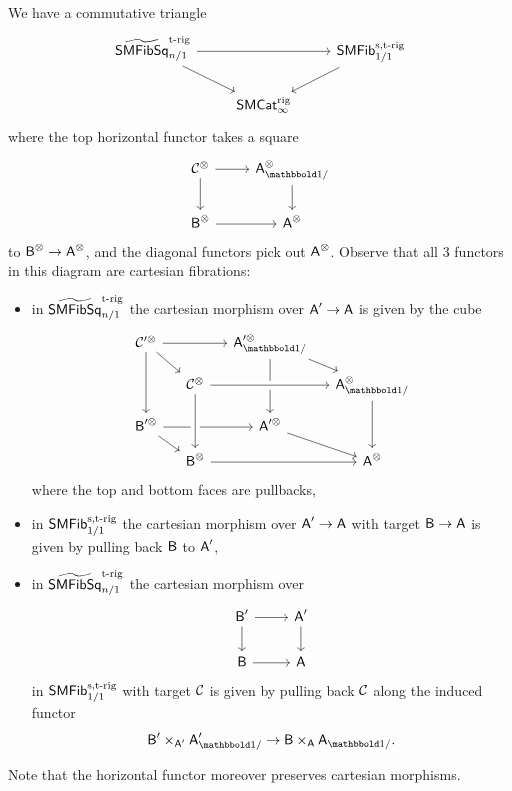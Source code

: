 \documentclass[a4paper,11pt]{article}
\begin{document}
\begin{observation}
  We have a commutative triangle
  \[
    \begin{tikzcd}
      \tSMFibSqtrig_{n/1}
     \ar[rr] \ar[dr] & & \SMFibstrig_{1/1} \ar[dl] \\
      & \SMCatI^{\rig}
    \end{tikzcd}
  \]
  where the top horizontal functor takes a square
  \[
    \begin{tikzcd}
      \nC^{\otimes} \ar[r] \ar[d] & \oA_{\bbone/}^{\otimes} \ar[d]
      \\
      \oB^{\otimes} \ar[r] & \oA^{\otimes}
    \end{tikzcd}
  \]
  to $\oB^{\otimes} \to \oA^{\otimes}$, and the diagonal functors pick
  out $\textup{\textsf{A}}^{\otimes}$. Observe that all 3 functors in this diagram are cartesian fibrations:
  \begin{itemize}
  \item in $\widetilde{\textup{\textsf{SMFibSq}}}^{\text{\textup{t-rig}}}_{n/1}$ the cartesian morphism over
    $\oA' \to \oA$ is given by the cube
    \[
      \begin{tikzcd}[row sep=small,column sep=small]
        \nC'^{\otimes} \ar[rr] \ar[dr] \ar[dd] & & \oA'^{\otimes}_{\bbone/} \ar[dr] \ar[dd] \\
        & \nC^{\otimes} \ar[rr,crossing over] & & \oA^{\otimes}_{\bbone/} \ar[dd] \\
        \oB'^{\otimes} \ar[rr] \ar[dr] & & \oA'^{\otimes}  \ar[dr] \\
        & \oB^{\otimes}  \ar[rr]  \ar[uu,leftarrow,crossing over] & & \oA^{\otimes} 
      \end{tikzcd}
    \]
    where the top and bottom faces are pullbacks,
  \item in $\textup{\textsf{SMFib}}^{\text{\textup{s,t-rig}}}_{1/1}$ the cartesian morphism over $\oA' \to
    \oA$ with target $\oB \to \oA$ is given by pulling back $\textup{\textsf{B}}$ to $\textup{\textsf{A}}'$,
  \item in $\widetilde{\textup{\textsf{SMFibSq}}}^{\text{\textup{t-rig}}}_{n/1}$ the cartesian morphism over
    \[
      \begin{tikzcd}
        \oB' \ar[r] \ar[d] & \oA'  \ar[d] \\
        \oB \ar[r] & \oA
      \end{tikzcd}
    \]
    in $\textup{\textsf{SMFib}}^{\text{\textup{s,t-rig}}}_{1/1}$ with target $\mathcal{C}$ is given by 
    pulling back $\mathcal{C}$ along the induced functor \[\oB'
      \times_{\oA'} \oA'_{\bbone/} \to \oB \times_{\oA} \oA_{\bbone/}.\]
  \end{itemize}
  Note that the horizontal functor moreover preserves cartesian morphisms.
  

\end{observation}
\end{document}
